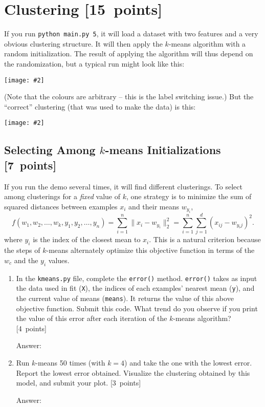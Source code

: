 \documentclass{article}
\newcommand{\blu}[1]{{\textcolor{blu}{#1}}}
\newenvironment{answer}{\par\begingroup\color{gre}Answer: }{\endgroup}
\let\ask\blu
\newcommand\pts[1]{\textcolor{pointscolour}{[#1~points]}}
\newcommand{\norm}[1]{\lVert #1 \rVert}
\newcommand{\centerfig}[2]{\begin{center}\texttt{[image: \#2]}\end{center}}
\begin{document}
    \clearpage
    \section{Clustering \pts{15}}

    If you run \verb|python main.py 5|, it will load a dataset with two features
    and a very obvious clustering structure. It will then apply the $k$-means algorithm
    with a random initialization. The result of applying the
    algorithm will thus depend on the randomization, but a typical run might look like this:
    \centerfig{.5}{figs/kmeans_basic.png}
    (Note that the colours are arbitrary -- this is the label switching issue.)
    But the ``correct'' clustering (that was used to make the data) is this:
    \centerfig{.5}{figs/kmeans_good.png}


    \clearpage
    \subsection{Selecting Among $k$-means Initializations \pts{7}}

    If you run the demo several times, it will find different clusterings. To select among clusterings for a \emph{fixed} value of $k$, one strategy is to minimize the sum of squared distances between examples $x_i$ and their means $w_{y_i}$,
    \[
    f(w_1,w_2,\dots,w_k,y_1,y_2,\dots,y_n) = \sum_{i=1}^n \norm{x_i - w_{y_i}}_2^2 = \sum_{i=1}^n \sum_{j=1}^d (x_{ij} - w_{y_ij})^2.
    \]
    where $y_i$ is the index of the closest mean to $x_i$. This is a natural criterion because the steps of $k$-means alternately optimize this objective function in terms of the $w_c$ and the $y_i$ values.

    \begin{enumerate}
        \item In the \texttt{kmeans.py} file, complete the \texttt{error()} method. \texttt{error()} takes as input the data used in fit (\texttt{X}), the indices of each examples' nearest mean (\texttt{y}), and the current value of means (\texttt{means}). It returns the value of this above objective function. \ask{Submit this code. What trend do you observe if you print the value of this error after each iteration of the $k$-means algorithm?} \pts{4}
        \begin{answer}

        \end{answer}
        \item Run $k$-means 50 times (with $k=4$) and take the one with the lowest error. \ask{Report the lowest error obtained.} Visualize the clustering obtained by this model, and \ask{submit your plot}. \pts{3}
        \begin{answer}

        \end{answer}
    \end{enumerate}
\end{document}
